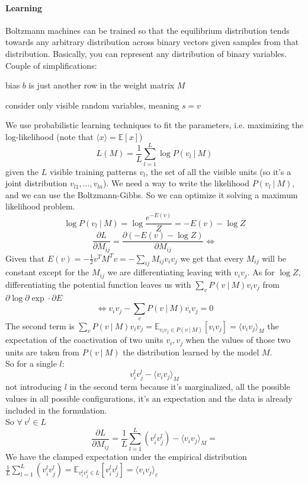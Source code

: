 \documentclass[10pt]{report}
\begin{document}
\paragraph{Learning} Boltzmann machines can be trained so that the equilibrium distribution tends towards any arbitrary distribution across binary vectors given samples from that distribution. Basically, you can represent any distribution of binary variables.\\
Couple of simplifications:
\begin{list}{}{}
	\item bias $b$ is just another row in the weight matrix $M$
	\item consider only visible random variables, meaning $s = v$
\end{list}
We use probabilistic learning techniques to fit the parameters, i.e. maximizing the log-likelihood (note that $\langle x\rangle = \mathbb{E}[x]$) $$L(M)=\frac{1}{L}\sum_{l=1}^L \log P(v_l\:|\:M)$$
given the $L$ visible training patterns $v_l$, the set of all the visible units (so it's a joint distribution $v_{l1},\ldots,v_{ln}$). We need a way to write the likelihood $P(v_l\:|\:M)$, and we can use the Boltzmann-Gibbs. So we can optimize it solving a maximum likelihood problem.
$$\log P(v_l\:|\:M) = \log \frac{e^{-E(v)}}{Z} = -E(v) - \log Z$$
$$\frac{\partial L}{\partial M_{ij}} = \frac{\partial (-E(v) - \log Z)}{\partial M_{ij}}\Leftrightarrow$$
Given that $E(v) = -\frac{1}{2}v^TM^Tv = -\sum_{ij} M_{ij} v_iv_j$ we get that every $M_{ij}$ will be constant except for the $M_{ij}$ we are differentiating leaving with $v_iv_j$. As for $\log Z$, differentiating the potential function leaves us with $\sum_v P(v\:|\:M)v_iv_j$ from $\partial\log\partial\exp\cdot\partial E$
$$\Leftrightarrow v_iv_j - \sum_v P(v\:|\:M)v_iv_j = 0$$
The second term is $\sum_v P(v\:|\:M)v_iv_j = \mathbb{E}_{v_iv_j\in P(v\:|\:M)}[v_iv_j] = \langle v_iv_j\rangle_M$ the expectation of the coactivation of two units $v_i,v_j$ when the values of those two units are taken from $P(v\:|\:M)$ the distribution learned by the model $M$.\\
So for a single $l$:
$$v_i^lv_j^l - \langle v_iv_j\rangle_M$$
not introducing $l$ in the second term because it's marginalized, all the possible values in all possible configurations, it's an expectation and the data is already included in the formulation.\\
So $\forall\:v^l\in L$ $$\frac{\partial L}{\partial M_{ij}} = \frac{1}{L}\sum_{l=1}^L (v_i^lv_j^l)-\langle v_iv_j\rangle_M=$$
We have the clamped expectation under the empirical distribution $\frac{1}{L}\sum_{l=1}^L (v_i^lv_j^l) = \mathbb{E}_{v_i^lv_j^l\in L}[v_i^lv_j^l] = \langle v_iv_j\rangle_c$
\end{document}
